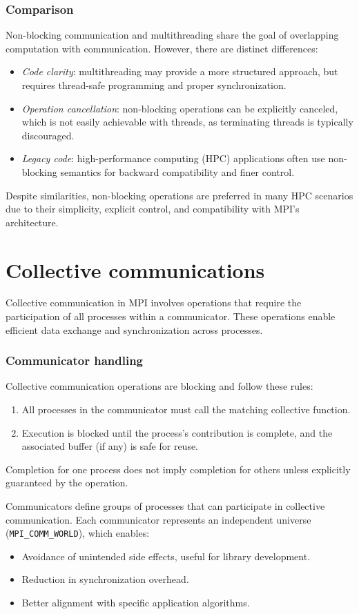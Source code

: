 \subsubsection{Comparison}
Non-blocking communication and multithreading share the goal of overlapping computation with communication. However, there are distinct differences:
\begin{itemize}
    \item \textit{Code clarity}: multithreading may provide a more structured approach, but requires thread-safe programming and proper synchronization.
    \item \textit{Operation cancellation}: non-blocking operations can be explicitly canceled, which is not easily achievable with threads, as terminating threads is typically discouraged.
    \item \textit{Legacy code}: high-performance computing (HPC) applications often use non-blocking semantics for backward compatibility and finer control.
\end{itemize}
Despite similarities, non-blocking operations are preferred in many HPC scenarios due to their simplicity, explicit control, and compatibility with MPI's architecture.

\section{Collective communications}
Collective communication in MPI involves operations that require the participation of all processes within a communicator. 
These operations enable efficient data exchange and synchronization across processes. 

\subsubsection{Communicator handling}
Collective communication operations are blocking and follow these rules:
\begin{enumerate}
    \item All processes in the communicator must call the matching collective function.
    \item Execution is blocked until the process's contribution is complete, and the associated buffer (if any) is safe for reuse.
\end{enumerate}
Completion for one process does not imply completion for others unless explicitly guaranteed by the operation.

Communicators define groups of processes that can participate in collective communication. 
Each communicator represents an independent universe (\texttt{MPI\_COMM\_WORLD}), which enables:
\begin{itemize}
    \item Avoidance of unintended side effects, useful for library development.
    \item Reduction in synchronization overhead.
    \item Better alignment with specific application algorithms.
\end{itemize}

